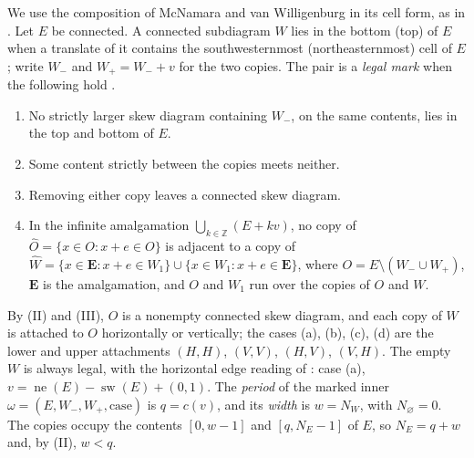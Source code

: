 \documentclass[11pt,a4paper]{amsart}
\numberwithin{equation}{section}
\theoremstyle{plain}
\theoremstyle{definition}
\newcommand{\Z}{\mathbb Z}
\begin{document}
We use the composition of McNamara and van Willigenburg \cite[Def.~3.11]{McNamara2009Classification} in its cell form, as in \cite{Shields2026Gluing}.  Let \(E\) be connected.  A connected subdiagram \(W\) lies in the bottom (top) of \(E\) when a translate of it contains the southwesternmost (northeasternmost) cell of \(E\); write \(W_-\) and \(W_+=W_-+v\) for the two copies.  The pair is a \emph{legal mark} when the following hold \cite[Hyps.~3.8 and~3.22]{McNamara2009Classification}.
\begin{enumerate}
\item[(I)] No strictly larger skew diagram containing \(W_-\), on the same contents, lies in the top and bottom of \(E\).
\item[(II)] Some content strictly between the copies meets neither.
\item[(III)] Removing either copy leaves a connected skew diagram.
\item[(IV)] In the infinite amalgamation \(\bigcup_{k\in\Z}(E+kv)\), no copy of \(\widehat O=\{x\in O:x+e\in O\}\) is adjacent to a copy of \(\widehat W=\{x\in\boldsymbol E:x+e\in W_1\}\cup\{x\in W_1:x+e\in\boldsymbol E\}\), where \(O=E\setminus(W_-\cup W_+)\), \(\boldsymbol E\) is the amalgamation, and \(O\) and \(W_1\) run over the copies of \(O\) and \(W\).
\end{enumerate}
By (II) and (III), \(O\) is a nonempty connected skew diagram, and each copy of \(W\) is attached to \(O\) horizontally or vertically; the cases (a), (b), (c), (d) are the lower and upper attachments \((H,H)\), \((V,V)\), \((H,V)\), \((V,H)\).  The empty \(W\) is always legal, with the horizontal edge reading of \cite[Ex.~3.7]{McNamara2009Classification}: case (a), \(v=\operatorname{ne}(E)-\operatorname{sw}(E)+(0,1)\).  The \emph{period} of the marked inner \(\omega=(E,W_-,W_+,\text{case})\) is \(q=c(v)\), and its \emph{width} is \(w=N_W\), with \(N_\varnothing=0\).  The copies occupy the contents \([0,w-1]\) and \([q,N_E-1]\) of \(E\), so \(N_E=q+w\) and, by (II), \(w<q\).
\end{document}
